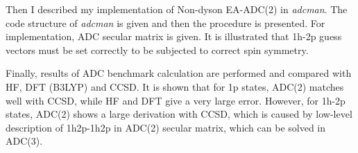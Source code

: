 \documentclass[bachelor, english]{ustcthesis}
\begin{document}
Then I described my implementation of Non-dyson EA-ADC(2) in \emph{adcman}.
The code structure of \emph{adcman} is given and then the procedure is presented.
For implementation, ADC secular matrix is given.
It is illustrated that 1h-2p guess vectors must be set correctly to be subjected to correct spin symmetry.

Finally, results of ADC benchmark calculation are performed and compared with HF, DFT (B3LYP) and CCSD.
It is shown that for 1p states, ADC(2) matches well with CCSD, while HF and DFT give a very large error.
However, for 1h-2p states, ADC(2) shows a large derivation with CCSD, which is caused by low-level description of 1h2p-1h2p in ADC(2) secular matrix, which can be solved in ADC(3).

%
%
%

%

\backmatter
%
\end{document}
